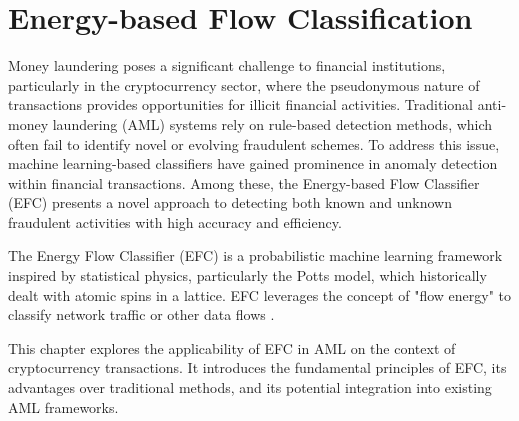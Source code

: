 \section{Energy-based Flow Classification}
Money laundering poses a significant challenge to financial institutions, particularly
in the cryptocurrency sector, where the pseudonymous nature of transactions provides
opportunities for illicit financial activities. Traditional anti-money laundering
(AML) systems rely on rule-based detection methods, which often fail to identify
novel or evolving fraudulent schemes. To address this issue, machine learning-based
classifiers have gained prominence in anomaly detection within financial transactions.
Among these, the Energy-based Flow Classifier (EFC) presents a novel approach to
detecting both known and unknown fraudulent activities with high accuracy and efficiency.

The Energy Flow Classifier (EFC) is a probabilistic machine learning framework
inspired by statistical physics, particularly the Potts model, which historically
dealt with atomic spins in a lattice. EFC leverages the concept of "flow energy"
to classify network traffic or other data flows \cite{pontes2021}.

This chapter explores the applicability of EFC in AML on the context of cryptocurrency
transactions. It introduces the fundamental principles of EFC, its advantages over
traditional methods, and its potential integration into existing AML frameworks.

